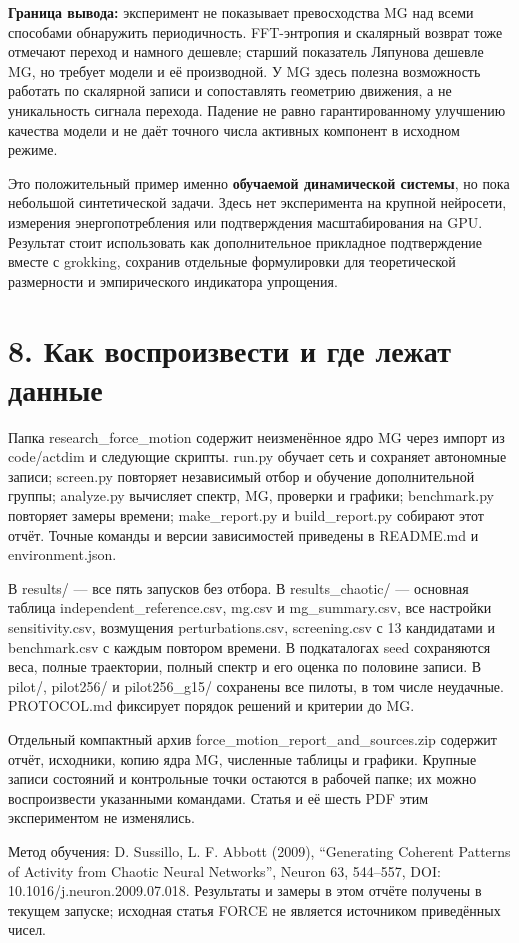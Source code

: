 \documentclass[10pt,a4paper]{article}
\begin{document}
\textbf{Граница вывода:} эксперимент не показывает превосходства MG над всеми способами обнаружить периодичность. FFT-энтропия и скалярный возврат тоже отмечают переход и намного дешевле; старший показатель Ляпунова дешевле MG, но требует модели и её производной. У MG здесь полезна возможность работать по скалярной записи и сопоставлять геометрию движения, а не уникальность сигнала перехода. Падение не равно гарантированному улучшению качества модели и не даёт точного числа активных компонент в исходном режиме.

Это положительный пример именно \textbf{обучаемой динамической системы}, но пока небольшой синтетической задачи. Здесь нет эксперимента на крупной нейросети, измерения энергопотребления или подтверждения масштабирования на GPU. Результат стоит использовать как дополнительное прикладное подтверждение вместе с grokking, сохранив отдельные формулировки для теоретической размерности и эмпирического индикатора упрощения.

\section*{8. Как воспроизвести и где лежат данные}

Папка research\_force\_motion содержит неизменённое ядро MG через импорт из code/actdim и следующие скрипты. run.py обучает сеть и сохраняет автономные записи; screen.py повторяет независимый отбор и обучение дополнительной группы; analyze.py вычисляет спектр, MG, проверки и графики; benchmark.py повторяет замеры времени; make\_report.py и build\_report.py собирают этот отчёт. Точные команды и версии зависимостей приведены в README.md и environment.json.

В results/ --- все пять запусков без отбора. В results\_chaotic/ --- основная таблица independent\_reference.csv, mg.csv и mg\_summary.csv, все настройки sensitivity.csv, возмущения perturbations.csv, screening.csv с 13 кандидатами и benchmark.csv с каждым повтором времени. В подкаталогах seed сохраняются веса, полные траектории, полный спектр и его оценка по половине записи. В pilot/, pilot256/ и pilot256\_g15/ сохранены все пилоты, в том числе неудачные. PROTOCOL.md фиксирует порядок решений и критерии до MG.

Отдельный компактный архив force\_motion\_report\_and\_sources.zip содержит отчёт, исходники, копию ядра MG, численные таблицы и графики. Крупные записи состояний и контрольные точки остаются в рабочей папке; их можно воспроизвести указанными командами. Статья и её шесть PDF этим экспериментом не изменялись.

Метод обучения: D. Sussillo, L. F. Abbott (2009), “Generating Coherent Patterns of Activity from Chaotic Neural Networks”, Neuron 63, 544--557, DOI: 10.1016/j.neuron.2009.07.018. Результаты и замеры в этом отчёте получены в текущем запуске; исходная статья FORCE не является источником приведённых чисел.
\end{document}
